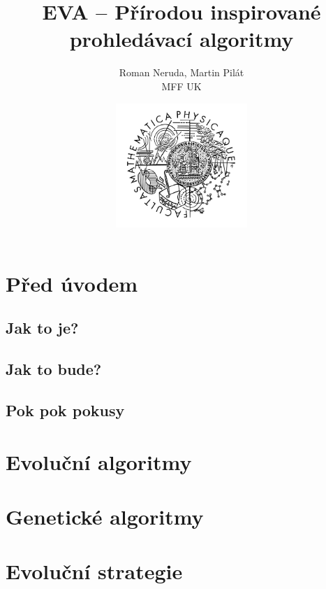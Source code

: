 \documentclass[12pt,fleqn,a4paper,oneside]{book}
\title{EVA -- Přírodou inspirované prohledávací algoritmy}
\author{Roman Neruda, Martin Pilát\\
MFF UK
}
\date{\includegraphics[width=5cm]{mff_logo.png}}
\begin{document}
\sloppy 

\maketitle

\mainmatter

\chapter{Před úvodem}
\section{Jak to je?}

\section{Jak to bude?}
\section{Pok pok pokusy}


\chapter{Evoluční algoritmy}


\chapter{Genetické algoritmy}


\chapter{Evoluční strategie}



\backmatter

\tableofcontents
\printindex
\listoffigures
\listoftables
\listofalgorithms 

\nocite{*}


\end{document}

